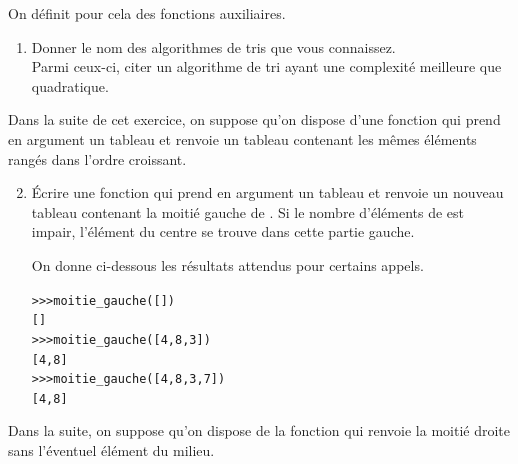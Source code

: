 \documentclass[11pt,a4paper,french,twoside]{PMCours}
\begin{document}
On définit pour cela des fonctions auxiliaires.
\begin{enumerate}
\item Donner le nom des algorithmes de tris que vous connaissez. \\
Parmi ceux-ci, citer un algorithme de tri ayant une complexité meilleure que quadratique.
\end{enumerate}

Dans la suite de cet exercice, on suppose qu'on dispose d'une fonction  qui prend en
argument un tableau et renvoie un tableau contenant les mêmes éléments rangés dans l'ordre
croissant.

\begin{enumerate}\setcounter{enumi}{1}
\item Écrire une fonction  qui prend en argument un tableau  et
renvoie un nouveau tableau contenant la moitié gauche de . Si le nombre d'éléments
de  est impair, l'élément du centre se trouve dans cette partie gauche.

On donne ci-dessous les résultats attendus pour certains appels.
\begin{alltt}
>>> moitie\_gauche([])
[]
>>> moitie\_gauche([4, 8, 3])
[4, 8]
>>> moitie\_gauche ([4, 8, 3, 7])
[4, 8]
\end{alltt}
\end{enumerate}

Dans la suite, on suppose qu'on dispose de la fonction  qui renvoie la
moitié droite sans l'éventuel élément du milieu.
\end{document}

